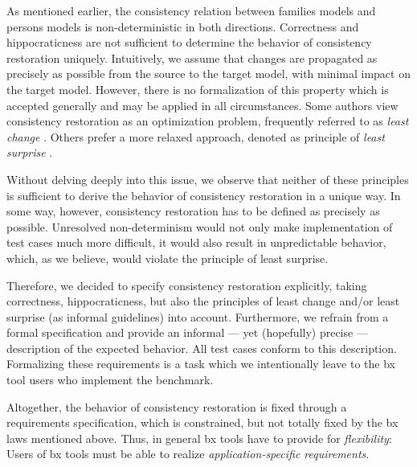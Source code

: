 As mentioned earlier, the consistency relation between families models and persons models is non-de\-ter\-min\-istic in both directions. Correctness and hippocraticness are not sufficient to determine the behavior of consistency restoration uniquely. Intuitively, we assume that changes are propagated as precisely as possible from the source to the target model, with minimal impact on the target model. However, there is no formalization of this property which is accepted generally and may be applied in all circumstances. Some authors view consistency restoration as an optimization problem, frequently referred to as \emph{least change} \cite{SOSYM-Macedo2016}. Others prefer a more relaxed approach, denoted as principle of \emph{least surprise} \cite{Cheney2015}.

Without delving deeply into this issue, we observe that neither of these principles is sufficient to derive the behavior of consistency restoration in a unique way. In some way, however, consistency restoration has to be defined as precisely as possible. Unresolved non-determinism would not only make implementation of test cases much more difficult, it would also result in unpredictable behavior, which, as we believe, would violate the principle of least surprise.

Therefore, we decided to specify consistency restoration explicitly, taking correctness, hippocraticness, but also the principles of least change and/or least surprise (as informal guidelines) into account. Furthermore, we refrain from a formal specification and provide an informal --- yet (hopefully) precise --- description of the expected behavior. All test cases conform to this description. Formalizing these requirements is a task which we intentionally leave to the bx tool users who implement the benchmark.

Altogether, the behavior of consistency restoration is fixed through a requirements specification, which is constrained, but not totally fixed by the bx laws mentioned above. Thus, in general bx tools have to provide for \emph{flexibility}: Users of bx tools must be able to realize \emph{application-specific requirements}.



